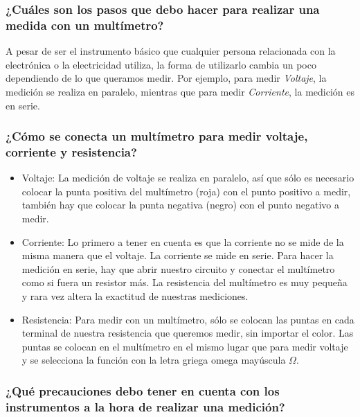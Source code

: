 \documentclass[letterpaper, 12pt]{report}
\begin{document}
\subsubsection{¿Cuáles son los pasos que debo hacer para realizar una medida
	con un multímetro?}

A pesar de ser el instrumento básico que cualquier persona relacionada con
la electrónica o la electricidad utiliza, la forma de utilizarlo cambia un poco
dependiendo de lo que queramos medir. Por ejemplo, para medir \textit{Voltaje},
la medición se realiza en paralelo, mientras que para medir \textit{Corriente},
la medición es en serie.

\subsubsection{¿Cómo se conecta un multímetro para medir voltaje, corriente
	y resistencia?}

\begin{itemize}
	\item Voltaje: La medición de voltaje se realiza en paralelo, así que
	      sólo es necesario colocar la punta positiva del multímetro (roja) con
	      el punto positivo a medir, también hay que colocar la punta negativa
	      (negro) con el punto negativo a medir.~\cite{AcMaxMexico}

	\item Corriente: Lo primero a tener en cuenta es que la corriente no se
	      mide de la misma manera que el voltaje. La corriente se mide en serie.
	      Para hacer la medición en serie, hay que abrir nuestro circuito y
	      conectar el multímetro como si fuera un resistor más. La resistencia
	      del multímetro es muy pequeña y rara vez altera la exactitud de
	      nuestras mediciones.~\cite{AcMaxMexico}

	\item Resistencia: Para medir con un multímetro, sólo se colocan las puntas
	      en cada terminal de nuestra resistencia que queremos medir, sin importar
	      el color. Las puntas se colocan en el multímetro en el mismo lugar que
	      para medir voltaje y se selecciona la función con la letra griega omega
	      mayúscula $\Omega$.~\cite{AcMaxMexico}
\end{itemize}

\subsubsection{¿Qué precauciones debo tener en cuenta con los instrumentos a
	la hora de realizar una medición?}
\end{document}
